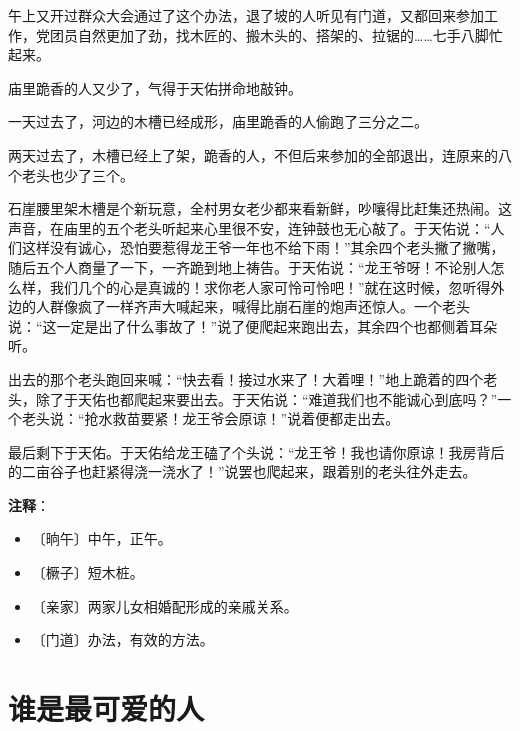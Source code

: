 \documentclass[12pt,UTF-8,openany]{ctexbook}
\begin{document}
\begin{normalsize}
    午上又开过群众大会通过了这个办法，退了坡的人听见有门道，又都回来参加工作，党团员自然更加了劲，找木匠的、搬木头的、搭架的、拉锯的……七手八脚忙起来。
    
    庙里跪香的人又少了，气得于天佑拼命地敲钟。
    
    一天过去了，河边的木槽已经成形，庙里跪香的人偷跑了三分之二。
    
    两天过去了，木槽已经上了架，跪香的人，不但后来参加的全部退出，连原来的八个老头也少了三个。
    
    石崖腰里架木槽是个新玩意，全村男女老少都来看新鲜，吵嚷得比赶集还热闹。这声音，在庙里的五个老头听起来心里很不安，连钟鼓也无心敲了。于天佑说：“人们这样没有诚心，恐怕要惹得龙王爷一年也不给下雨！”其余四个老头撇了撇嘴，随后五个人商量了一下，一齐跪到地上祷告。于天佑说：“龙王爷呀！不论别人怎么样，我们几个的心是真诚的！求你老人家可怜可怜吧！”就在这时候，忽听得外边的人群像疯了一样齐声大喊起来，喊得比崩石崖的炮声还惊人。一个老头说：“这一定是出了什么事故了！”说了便爬起来跑出去，其余四个也都侧着耳朵听。
    
    出去的那个老头跑回来喊：“快去看！接过水来了！大着哩！”地上跪着的四个老头，除了于天佑也都爬起来要出去。于天佑说：“难道我们也不能诚心到底吗？”一个老头说：“抢水救苗要紧！龙王爷会原谅！”说着便都走出去。
    
    最后剩下于天佑。于天佑给龙王磕了个头说：“龙王爷！我也请你原谅！我房背后的二亩谷子也赶紧得浇一浇水了！”说罢也爬起来，跟着别的老头往外走去。
    
\end{normalsize}


\newpage

\textbf{注释}：

\vspace{-1em}

\begin{itemize}
    \setlength\itemsep{-0.2em}
    \item 〔晌午〕中午，正午。
    \item 〔橛子〕短木桩。
    \item 〔亲家〕两家儿女相婚配形成的亲戚关系。
    \item 〔门道〕办法，有效的方法。
\end{itemize}

\chapter{谁是最可爱的人}
\end{document}
